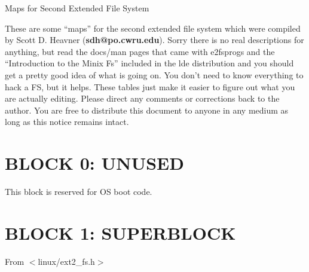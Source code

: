 
% 
%
\parindent 0pt
\parskip 5pt
\topmargin 0pt
\textheight 9in
\textwidth 6.5in
\oddsidemargin 0pt
\evensidemargin 0pt
\pagestyle{myheadings}
	{Maps for Second Extended File System}



These are some ``maps'' for the second extended file system which 
were compiled by 
Scott D. Heavner \linebreak[4]
({\bf sdh@po.cwru.edu}).  Sorry there is no real descriptions for
anything, but read the docs/man pages that came with e2fsprogs and 
the ``Introduction to the Minix Fs'' included in the lde distribution
and you should get a pretty good idea of what is going on.  You don't
need to know everything to hack a FS, but it helps.  These tables just
make it easier to figure out what you are actually editing. 
Please direct any comments or
corrections back to the author.  You are free to distribute this
document to anyone in any medium as long as this notice remains intact.

\section*{BLOCK 0: UNUSED}

This block is reserved for OS boot code.

\section*{BLOCK 1: SUPERBLOCK}

From $<$linux/ext2\_fs.h$>$

